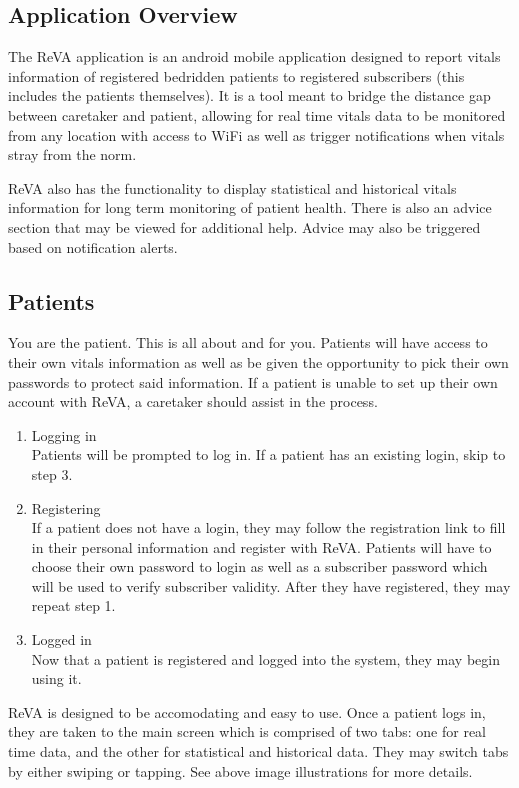 \subsection{Application Overview}
The ReVA application is an android mobile application designed to report vitals information of registered bedridden patients to registered subscribers (this includes the patients themselves). It is a tool meant to bridge the distance gap between caretaker and patient, allowing for real time vitals data to be monitored from any location with access to WiFi as well as trigger notifications when vitals stray from the norm. 

ReVA also has the functionality to display statistical and historical vitals information for long term monitoring of patient health. There is also an advice section that may be viewed for additional help. Advice may also be triggered based on notification alerts. 

\subsection{Patients}
	You are the patient. This is all about and for you. Patients will have access to their own vitals information as well as be given the opportunity to pick their own passwords to protect said information. If a patient is unable to set up their own account with ReVA, a caretaker should assist in the process. 
	\begin{enumerate}	
	\item Logging in\\
		Patients will be prompted to log in. If a patient has an existing login, skip to step 3. 
	\item Registering\\
		If a patient does not have a login, they may follow the registration link to fill in their personal information and 			register with ReVA. Patients will have to choose their own password to login as well as a subscriber password which will 		 be used to verify subscriber validity. After they have registered, they may repeat step 1. 
	\item Logged in\\
		Now that a patient is registered and logged into the system, they may begin using it. 
	\end{enumerate}
	ReVA is designed to be accomodating and easy to use. Once a patient logs in, they are taken to the main screen which is comprised of two tabs: one for real time data, and the other for statistical and historical data. They may switch tabs by either swiping or tapping. See above image illustrations for more details. 
	
